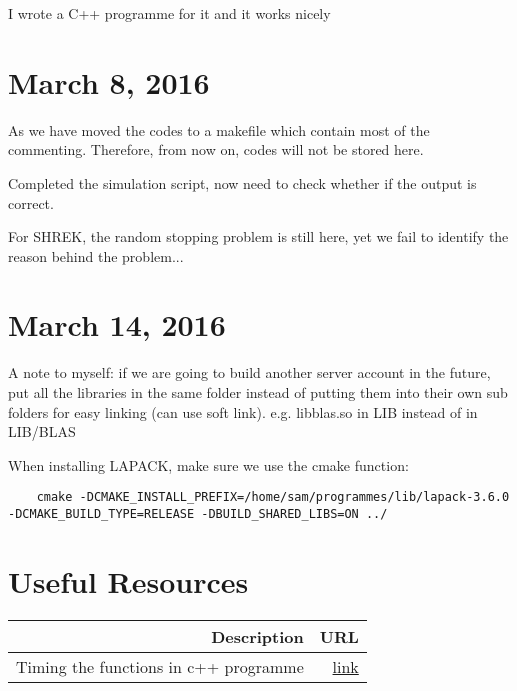 \documentclass[12pt]{article}
\begin{document}
		I wrote a C++ programme for it and it works nicely
		
	
	\section{March 8, 2016}
	As we have moved the codes to a makefile which contain most of the commenting.
	Therefore, from now on, codes will not be stored here. 
	
	Completed the simulation script, now need to check whether if the output is correct.
	
	For SHREK, the random stopping problem is still here, yet we fail to identify the reason behind the problem...
	
	\section{March 14, 2016}
	A note to myself: if we are going to build another server account in the future, put all the libraries in the same folder instead of putting them into their own sub folders for easy linking (can use soft link).
	e.g. libblas.so in LIB instead of in LIB/BLAS
	
	When installing LAPACK, make sure we use the cmake function:
	\begin{lstlisting}
	cmake -DCMAKE_INSTALL_PREFIX=/home/sam/programmes/lib/lapack-3.6.0 -DCMAKE_BUILD_TYPE=RELEASE -DBUILD_SHARED_LIBS=ON ../
	\end{lstlisting}
	
	\newpage
	\section{Useful Resources}
	\begin{table}[t]
		\centering
		\begin{tabular}{rr}
			\toprule
			Description & URL \\
			\midrule
			Timing the functions in c++ programme & \href{http://stackoverflow.com/a/21995693}{link}\\
			\bottomrule
		\end{tabular}
	\end{table}
\end{document}
